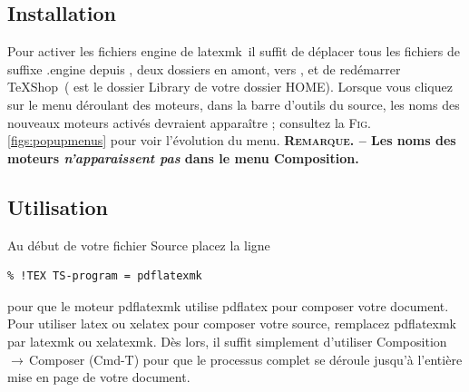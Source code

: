\documentclass[11pt,french]{article}
\newcommand{\TS}{\textsf{\TeX Shop}}
\newcommand{\latexmk}{\textsf{latexmk}}
\newcommand{\mnu}[1]{\textsf{#1}}
\newcommand{\cmd}[1]{\textsf{#1}}
\newcommand{\To}{\,\(\to\)\,}
\begin{document}
\subsection{Installation}

Pour activer les fichiers \cmd{engine} de \latexmk\ il suffit de déplacer tous les fichiers de suffixe \cmd{.engine}  depuis , deux dossiers en amont, vers , et de redémarrer \TS\ ( est le dossier \cmd{Library} de votre dossier \cmd{HOME}). Lorsque vous cliquez sur le menu déroulant des moteurs, dans la barre d'outils du source, les noms des nouveaux moteurs activés devraient apparaître ; consultez la \textsc{Fig.}\ref{figs:popupmenus} pour voir l'évolution du menu. \textbf{\textsc{Remarque}. -- Les noms des moteurs \emph{n'apparaissent pas} dans le menu \mnu{Composition}.}
 
%

\subsection{Utilisation}

Au début de votre fichier Source placez la ligne
\begin{verbatim}
% !TEX TS-program = pdflatexmk
\end{verbatim}
pour que le moteur \cmd{pdflatexmk} utilise \cmd{pdflatex} pour composer votre document. Pour utiliser \cmd{latex} ou \cmd{xelatex} pour composer votre source, remplacez \cmd{pdflatexmk} par \cmd{latexmk} ou \cmd{xelatexmk}. Dès lors, il suffit simplement d'utiliser \mnu{Composition}\To\mnu{Composer} (\cmd{Cmd-T}) pour que le processus complet se déroule jusqu'à l'entière mise en page de votre document. 

\end{document}
